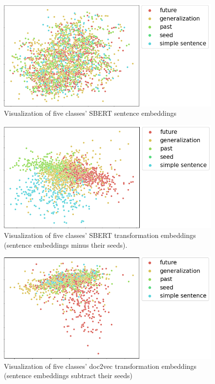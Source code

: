 \documentclass[11pt]{article}
\begin{document}
\begin{figure}[htp]
    \centering
    \includegraphics[scale=0.3]{figs/sbert_original.png}
    \caption{Visualization of five classes' SBERT sentence embeddings}\label{fig:sbert_original}
\end{figure}
\begin{figure}[htp]
    \centering
    \includegraphics[scale=0.3]{figs/sbert_vis.png}
    \caption{Visualization of five classes' SBERT transformation embeddings (sentence embeddings minus their seeds).}\label{fig:sbert_vis}
\end{figure}
\begin{figure}[htp]
    \centering
    \includegraphics[scale=0.3]{figs/doc2vec.png}
    \caption{Visualization of five classes' doc2vec transformation embeddings (sentence embeddings subtract their seeds) }\label{fig:doc2vec_vis}
\end{figure}
\end{document}
